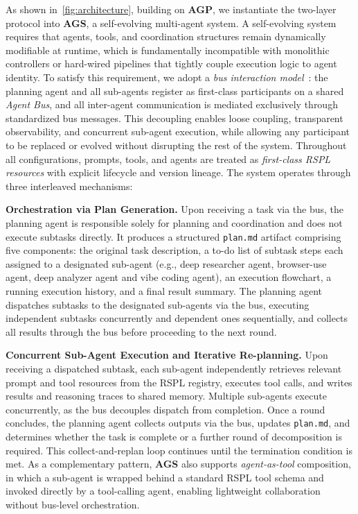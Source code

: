 \documentclass{article}
\theoremstyle{plain}
\theoremstyle{definition}
\theoremstyle{remark}
\newcommand{\projectname}{\textbf{\textsc{AGP}}\xspace}
\newcommand{\projectnameAgent}{\textbf{\textsc{AGS}}\xspace}
\begin{document}
As shown in~\cref{fig:architecture}, building on \projectname, we instantiate the two-layer protocol into \projectnameAgent, a self-evolving multi-agent system. A self-evolving system requires that agents, tools, and coordination structures remain dynamically modifiable at runtime, which is fundamentally incompatible with monolithic controllers or hard-wired pipelines that tightly couple execution logic to agent identity. To satisfy this requirement, we adopt a \emph{bus interaction model}~\cite{wu2024autogen, hong2023metagpt}: the planning agent and all sub-agents register as first-class participants on a shared \emph{Agent Bus}, and all inter-agent communication is mediated exclusively through standardized bus messages. This decoupling enables loose coupling, transparent observability, and concurrent sub-agent execution, while allowing any participant to be replaced or evolved without disrupting the rest of the system. Throughout all configurations, prompts, tools, and agents are treated as \emph{first-class RSPL resources} with explicit lifecycle and version lineage. The system operates through three interleaved mechanisms:

\textbf{Orchestration via Plan Generation.} Upon receiving a task via the bus, the planning agent is responsible solely for planning and coordination and does not execute subtasks directly. It produces a structured \texttt{plan.md} artifact comprising five components: the original task description, a to-do list of subtask steps each assigned to a designated sub-agent (e.g., deep researcher agent, browser-use agent, deep analyzer agent and vibe coding agent), an execution flowchart, a running execution history, and a final result summary. The planning agent dispatches subtasks to the designated sub-agents via the bus, executing independent subtasks concurrently and dependent ones sequentially, and collects all results through the bus before proceeding to the next round.

\textbf{Concurrent Sub-Agent Execution and Iterative Re-planning.} Upon receiving a dispatched subtask, each sub-agent independently retrieves relevant prompt and tool resources from the RSPL registry, executes tool calls, and writes results and reasoning traces to shared memory. Multiple sub-agents execute concurrently, as the bus decouples dispatch from completion. Once a round concludes, the planning agent collects outputs via the bus, updates \texttt{plan.md}, and determines whether the task is complete or a further round of decomposition is required. This collect-and-replan loop continues until the termination condition is met. As a complementary pattern, \projectnameAgent also supports \emph{agent-as-tool} composition, in which a sub-agent is wrapped behind a standard RSPL tool schema and invoked directly by a tool-calling agent, enabling lightweight collaboration without bus-level orchestration.
\end{document}
